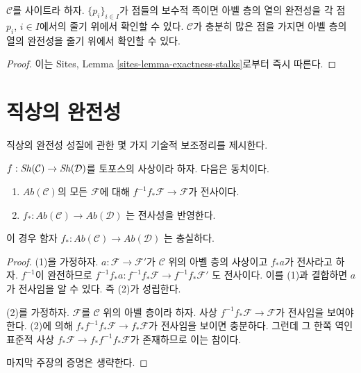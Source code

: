 \begin{lemma}
\label{lemma-check-exactness-stalks}
$\mathcal{C}$를 사이트라 하자. $\{p_i\}_{i \in I}$가 점들의 보수적
족이면 아벨 층의 열의 완전성을 각 점 $p_i$, $i \in I$에서의
줄기 위에서 확인할 수 있다. $\mathcal{C}$가 충분히 많은 점을 가지면
아벨 층의 열의 완전성을 줄기 위에서 확인할 수 있다.
\end{lemma}

\begin{proof}
이는 Sites, Lemma \ref{sites-lemma-exactness-stalks}로부터 즉시 따른다.
\end{proof}





\section{직상의 완전성}
\label{section-pushforward}

\noindent
직상의 완전성 성질에 관한 몇 가지 기술적 보조정리를 제시한다.

\begin{lemma}
\label{lemma-reflect-surjections}
$f : \mathop{\mathit{Sh}}\nolimits(\mathcal{C}) \to \mathop{\mathit{Sh}}\nolimits(\mathcal{D})$를 토포스의 사상이라 하자.
다음은 동치이다.
\begin{enumerate}
\item $\textit{Ab}(\mathcal{C})$의 모든 $\mathcal{F}$에 대해
$f^{-1}f_*\mathcal{F} \to \mathcal{F}$가 전사이다.
\item $f_* : \textit{Ab}(\mathcal{C}) \to \textit{Ab}(\mathcal{D})$
는 전사성을 반영한다.
\end{enumerate}
이 경우 함자
$f_* : \textit{Ab}(\mathcal{C}) \to \textit{Ab}(\mathcal{D})$
는 충실하다.
\end{lemma}

\begin{proof}
(1)을 가정하자. $a : \mathcal{F} \to \mathcal{F}'$가 $\mathcal{C}$ 위의
아벨 층의 사상이고 $f_*a$가 전사라고 하자. $f^{-1}$이 완전하므로
$f^{-1}f_*a : f^{-1}f_*\mathcal{F} \to f^{-1}f_*\mathcal{F}'$
도 전사이다. 이를 (1)과 결합하면 $a$가 전사임을 알 수 있다.
즉 (2)가 성립한다.

\medskip\noindent
(2)를 가정하자. $\mathcal{F}$를 $\mathcal{C}$ 위의 아벨 층이라 하자.
사상 $f^{-1}f_*\mathcal{F} \to \mathcal{F}$가 전사임을 보여야 한다.
(2)에 의해 $f_*f^{-1}f_*\mathcal{F} \to f_*\mathcal{F}$가 전사임을
보이면 충분하다. 그런데 그 한쪽 역인 표준적 사상
$f_*\mathcal{F} \to f_*f^{-1}f_*\mathcal{F}$가 존재하므로 이는 참이다.

\medskip\noindent
마지막 주장의 증명은 생략한다.
\end{proof}

